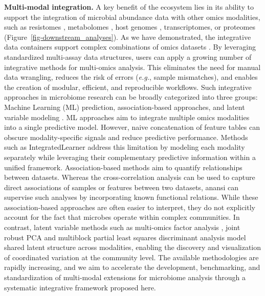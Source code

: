 \documentclass[
  sn-nature,
]{sn-jnl}
\begin{document}
\textbf{Multi-modal integration.} A key benefit of the ecosystem lies in
its ability to support the integration of microbial abundance data with
other omics modalities, such as resistomes \citep{salehi2025},
metabolomes \citep{hintikka2021}, host genomes \citep{qin2022},
transcriptomes, or proteomes \citep{nyholm2020, moreno-indias2021}
(Figure~\ref{fig-downstream_analyses}). As we have demonstrated, the
integrative data containers support complex combinations of omics
datasets \citep{huber2015, ramos2017, amezquita2020}. By leveraging
standardized multi-assay data structures, users can apply a growing
number of integrative methods for multi-omics analysis. This eliminates
the need for manual data wrangling, reduces the risk of errors
(\emph{e.g.}, sample mismatches), and enables the creation of modular,
efficient, and reproducible workflows. Such integrative approaches in
microbiome research can be broadly categorized into three groups:
Machine Learning (ML) prediction, association-based approaches, and
latent variable modeling
\citep{jeganathan2021, sherwani2025, moreno-indias2021, mallick2024, bastiaanssen2023, argelaguet2020, singh2019, mangnier2025}.
ML approaches aim to integrate multiple omics modalities into a single
predictive model. However, naive concatenation of feature tables can
obscure modality-specific signals and reduce predictive performance.
Methods such as IntegratedLearner \citep{mallick2024} address this
limitation by modeling each modality separately while leveraging their
complementary predictive information within a unified framework.
Association-based methods aim to quantify relationships between
datasets. Whereas the cross-correlation analysis can be used to capture
direct associations of samples or features between two datasets, anansi
can supervise such analyses by incorporating known functional relations.
While these association-based approaches are often easier to interpret,
they do not explicitly account for the fact that microbes operate within
complex communities. In contrast, latent variable methods such as
multi-omics factor analysis \citep{argelaguet2020}, joint robust PCA
\citep{martino2025} and multiblock partial least squares discriminant
analysis \citep{singh2019} model shared latent structure across
modalities, enabling the discovery and visualization of coordinated
variation at the community level. The available methodologies are
rapidly increasing, and we aim to accelerate the development,
benchmarking, and standardization of multi-modal extensions for
microbiome analysis through a systematic integrative framework proposed
here.
\end{document}
